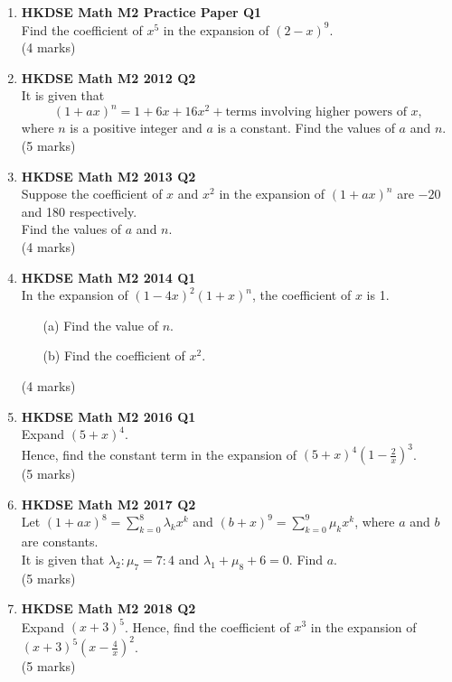 \documentclass{report}
\begin{document}
\begin{enumerate}
	\item \textbf{HKDSE Math M2 Practice Paper Q1}\\
	Find the coefficient of $x^5$ in the expansion of $(2-x)^9$. \\(4 marks)

	\item \textbf{HKDSE Math M2 2012 Q2}\\
	It is given that 
	$$(1+ax)^n = 1 + 6x + 16x^2 +\text{terms involving higher powers of }x,$$
	where $n$ is a positive integer and $a$ is a constant. Find the values of $a$ and $n$.\\(5 marks)

	\item \textbf{HKDSE Math M2 2013 Q2}\\
	Suppose the coefficient of $x$ and $x^2$ in the expansion of $(1+ax)^n$ are $-20$ and 180 respectively. \\
	Find the values of $a$ and $n$. \\(4 marks)

	\item \textbf{HKDSE Math M2 2014 Q1}\\
	In the expansion of $(1-4x)^2(1+x)^n$, the coefficient of $x$ is 1.
	\begin{enumerate}
		\item [(a)]Find the value of $n$. 
		\item [(b)]Find the coefficient of $x^2$. 
	\end{enumerate}
	(4 marks)

	\item \textbf{HKDSE Math M2 2016 Q1}\\
	Expand $(5+x)^4$. \\Hence, find the constant term in the expansion of $(5+x)^4\left(1-\displaystyle\frac{2}{x}\right)^3$. \\(5 marks)

	\item \textbf{HKDSE Math M2 2017 Q2}\\
	Let $\displaystyle(1+ax)^8 = \sum_{k = 0}^{8} \lambda _{k} x^{k}$ and $\displaystyle(b+x)^9 = \sum_{k = 0}^{9} \mu _{k} x^{k}$, where $a$ and $b$ are constants. \\
	It is given that $\lambda_2 : \mu_7 = 7:4$ and $\lambda_1 + \mu_8  + 6 = 0$. Find $a$.  \\(5 marks)

	\item  \textbf{HKDSE Math M2 2018 Q2}\\
	Expand $(x+3)^5$. Hence, find the coefficient of $x^3$ in the expansion of $(x+3)^5 \displaystyle\left(x - \frac{4}{x}\right) ^ 2$. \\(5 marks)


\end{enumerate}
\end{document}
